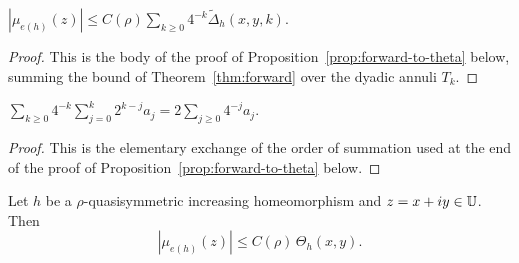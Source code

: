 \begin{lemma}\label{lem:dilatation_le_sum_deltaTilde}
	$|\mu_{e(h)}(z)|\le C(\rho)\sum_{k\ge0}4^{-k}\widetilde\Delta_h(x,y,k)$.
\end{lemma}
\begin{proof}
	This is the body of the proof of Proposition~\ref{prop:forward-to-theta} below, summing the bound of Theorem~\ref{thm:forward} over the dyadic annuli $T_k$.
\end{proof}

\begin{lemma}\label{lem:sum_exchange_geometric}
	\leanok
	$\sum_{k\ge0}4^{-k}\sum_{j=0}^k2^{k-j}a_j=2\sum_{j\ge0}4^{-j}a_j$.
\end{lemma}
\begin{proof}
	This is the elementary exchange of the order of summation used at the end of the proof of Proposition~\ref{prop:forward-to-theta} below.
\end{proof}

\begin{proposition}\label{prop:forward-to-theta}
	\leanok
	Let $h$ be a $\rho$-quasisymmetric increasing homeomorphism and $z=x+iy\in\mathbb{U}$. Then
	\[
	|\mu_{e(h)}(z)|\le C(\rho)\,\Theta_h(x,y).
	\]
\end{proposition}

